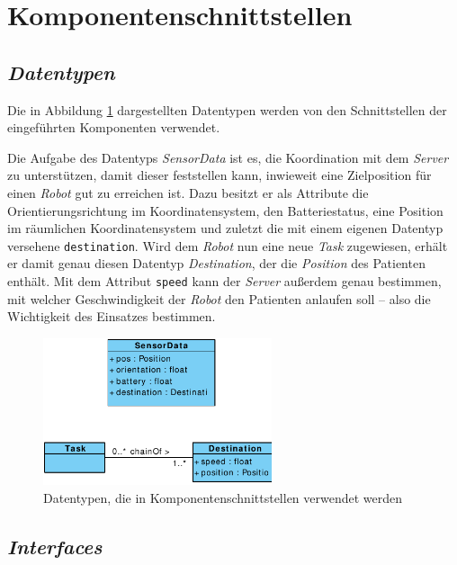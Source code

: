 \section{Komponentenschnittstellen}

\subsection{\textit{Datentypen}}
Die in Abbildung \ref{KomponentenschnittstellenDiagramm} dargestellten Datentypen werden von den Schnittstellen der eingeführten Komponenten verwendet.

Die Aufgabe des Datentyps \emph{SensorData} ist es, die Koordination mit dem \emph{Server} zu unterstützen, damit dieser feststellen kann, inwieweit eine Zielposition für einen \emph{Robot} gut zu erreichen ist. Dazu besitzt er als Attribute die Orientierungsrichtung im Koordinatensystem, den Batteriestatus, eine Position im räumlichen Koordinatensystem und zuletzt die mit einem eigenen Datentyp versehene \texttt{destination}. Wird dem \emph{Robot} nun eine neue \emph{Task} zugewiesen, erhält er damit genau diesen Datentyp \emph{Destination}, der die \emph{Position} des Patienten enthält. Mit dem Attribut \texttt{speed} kann der \emph{Server} außerdem genau bestimmen, mit welcher Geschwindigkeit der \emph{Robot} den Patienten anlaufen soll – also die Wichtigkeit des Einsatzes bestimmen.
\vspace{1cm}

	\begin{figure}[H]
		\centering
		\includegraphics[width=0.6\textwidth]{img/0-Entwurf-3}
		\caption{Datentypen, die in Komponentenschnittstellen verwendet werden}
		\label{KomponentenschnittstellenDiagramm}
	\end{figure}
	\pagebreak

\subsection{\textit{Interfaces}}

